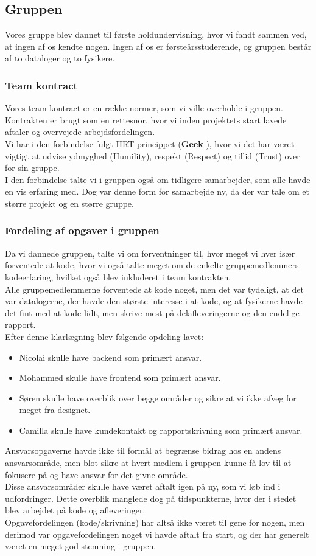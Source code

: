 \documentclass[]{article}
\begin{document}
\subsection{Gruppen}
Vores gruppe blev dannet til første holdundervisning, hvor vi fandt sammen ved, at ingen af os kendte nogen. Ingen af os er førsteårsstuderende, og gruppen består af to dataloger og to fysikere.
\subsubsection{Team kontract}
\noindent Vores team kontract er en række normer, som vi ville overholde i gruppen. Kontrakten er brugt som en rettesnor, hvor vi inden projektets start lavede aftaler og overvejede arbejdsfordelingen. \\
Vi har i den forbindelse fulgt HRT-princippet (\textbf{Geek} \cite{fitzpatrick2012team}), hvor vi det har været vigtigt at udvise ydmyghed (Humility), respekt (Respect) og tillid (Trust) over for sin gruppe. \\
I den forbindelse talte vi i gruppen også om tidligere samarbejder, som alle havde en vis erfaring med. Dog var denne form for samarbejde ny, da der var tale om et større projekt og en større gruppe.
\subsubsection{Fordeling af opgaver i gruppen}
\noindent Da vi dannede gruppen, talte vi om forventninger til, hvor meget vi hver især forventede at kode, hvor vi også talte meget om de enkelte gruppemedlemmers kodeerfaring, hvilket også blev inkluderet i team kontrakten. \\
Alle gruppemedlemmerne forventede at kode noget, men det var tydeligt, at det var datalogerne, der havde den største interesse i at kode, og at fysikerne havde det fint med at kode lidt, men skrive mest på delafleveringerne og den endelige rapport. \\
Efter denne klarlægning blev følgende opdeling lavet:
\begin{itemize}
    \item Nicolai skulle have backend som primært ansvar.
    \item Mohammed skulle have frontend som primært ansvar.
    \item Søren skulle have overblik over begge områder og sikre at vi ikke afveg for meget fra designet. 
    \item Camilla skulle have kundekontakt og rapportskrivning som primært ansvar. 
\end{itemize}
Ansvarsopgaverne havde ikke til formål at begrænse bidrag hos en andens ansvarsområde, men blot sikre at hvert medlem i gruppen kunne få lov til at fokusere på og have ansvar for det givne område. \\ 
Disse ansvarsområder skulle have været aftalt igen på ny, som vi løb ind i udfordringer. Dette overblik manglede dog på tidspunkterne, hvor der i stedet blev arbejdet på kode og afleveringer. \\
\indent Opgavefordelingen (kode/skrivning) har altså ikke været til gene for nogen, men derimod var opgavefordelingen noget vi havde aftalt fra start, og der har generelt været en meget god stemning i gruppen.
\end{document}
